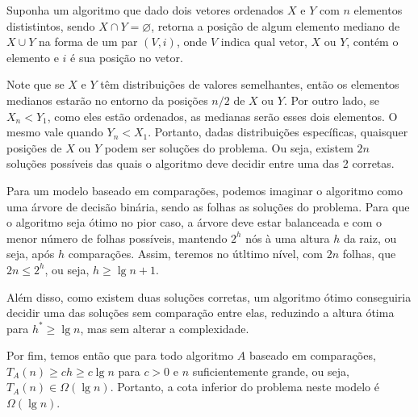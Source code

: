 Suponha um algoritmo que dado dois vetores ordenados $X$ e $Y$ com $n$ elementos dististintos, sendo $X \cap Y = \varnothing$, retorna a posição de algum elemento mediano de $X \cup Y$ na forma de um par $(V, i)$, onde $V$ indica qual vetor, $X$ ou $Y$, contém o elemento e $i$ é sua posição no vetor.

Note que se $X$ e $Y$ têm distribuições de valores semelhantes, então os elementos medianos estarão no entorno da posições $n/2$ de $X$ ou $Y$. Por outro lado, se $X_n < Y_1$, como eles estão ordenados, as medianas serão esses dois elementos. O mesmo vale quando $Y_n < X_1$. Portanto, dadas distribuições específicas, quaisquer posições de $X$ ou $Y$ podem ser soluções do problema. Ou seja, existem $2 n$ soluções possíveis das quais o algoritmo deve decidir entre uma das 2 corretas.

Para um modelo baseado em comparações, podemos imaginar o algoritmo como uma árvore de decisão binária, sendo as folhas as soluções do problema. Para que o algoritmo seja ótimo no pior caso, a árvore deve estar balanceada e com o menor número de folhas possíveis, mantendo $2^h$ nós à uma altura $h$ da raiz, ou seja, após $h$ comparações. Assim, teremos no útltimo nível, com $2 n$ folhas, que $2 n \leq 2^h$, ou seja, $h \geq \lg n + 1$.

Além disso, como existem duas soluções corretas, um algoritmo ótimo conseguiria decidir uma das soluções sem comparação entre elas, reduzindo a altura ótima para $h^* \geq \lg n$, mas sem alterar a complexidade.

Por fim, temos então que para todo algoritmo $A$ baseado em comparações, $T_A(n) \geq c h \geq c \lg n$ para $c > 0$ e $n$ suficientemente grande, ou seja, $T_A(n) \in \Omega(\lg n)$. Portanto, a cota inferior do problema neste modelo é $\Omega(\lg n)$.

